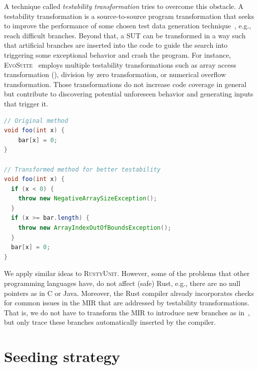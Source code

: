 \documentclass[paper=a4,%
  twoside,%
  BCOR4mm,%
  abstract=true,%
  toc=bibliography,%
  chapterprefix=true,%
  toc=bibliographynumbered,%
  open=right,%
  english,%
  pagesize=pdftex]{scrreprt}
\newcommand{\tech}{\textsc{RustyUnit}\xspace}
\newcommand{\mir}{\ac{MIR}\xspace}
\begin{document}
A technique called \emph{testability transformation} tries to overcome this obstacle. A testability transformation is a source-to-source program transformation that seeks to improve the performance of some chosen test data generation technique~\cite{Harman2004}, e.g., reach difficult branches. Beyond that, a \ac{SUT} can be transformed in a way such that artificial branches are inserted into the code to guide the search into triggering some exceptional behavior and crash the program. For instance, \textsc{EvoSuite}~\cite{Fraser2013} employs multiple testability transformations such as array access transformation (), division by zero transformation, or numerical overflow transformation. Those transformations do not increase code coverage in general but contribute to discovering potential unforeseen behavior and generating inputs that trigger it.

\begin{lstlisting}[language=Java, style=boxed, caption={Array access transformation in \textsc{EvoSuite} for Java}, label=lst:evosuite-array-access-transformation]
// Original method
void foo(int x) {
    bar[x] = 0;
}

// Transformed method for better testability
void foo(int x) {
  if (x < 0) {
    throw new NegativeArraySizeException();
  }
  if (x >= bar.length) {
    throw new ArrayIndexOutOfBoundsException();
  }
  bar[x] = 0;
}
\end{lstlisting}

We apply similar ideas to \tech. However, some of the problems that other programming languages have, do not affect (safe) Rust, e.g., there are no null pointers as in C or Java. Moreover, the Rust compiler already incorporates checks for common issues in the \mir that are addressed by testability transformations. That is, we do not have to transform the \mir to introduce new branches as in~, but only trace these branches automatically inserted by the compiler. 

\section{Seeding strategy}
\label{sec:seeding-strategy}
\end{document}
